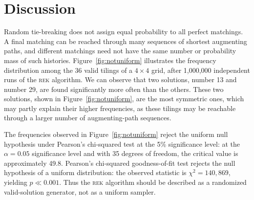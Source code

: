 \documentclass[svgnames,table,runningheads]{llncs}
\newcommand{\rek}{\textsc{rek}\xspace}
\begin{document}
\section{Discussion}
\label{sec:discussion}
Random tie-breaking does not assign equal probability to all perfect matchings. A final matching can be reached through many sequences of shortest augmenting paths, and different matchings need not have the same number or probability mass of such histories. Figure~\ref{fig:notuniform} illustrates the frequency distribution among the 36 valid tilings of a $4\times4$ grid, after 1,000,000 independent runs of the \rek algorithm. We can observe that two solutions, number 13 and number 29, are found significantly more often than the others. These two solutions, shown in Figure~\ref{fig:notuniform}, are the most symmetric ones, which may partly explain their higher frequencies, as these tilings may be reachable through a larger number of augmenting-path sequences.

The frequencies observed in Figure~\ref{fig:notuniform} reject the uniform null hypothesis under Pearson's chi-squared test at the 5\% significance level: at the \(\alpha = 0.05\) significance level and with 35 degrees of freedom, the critical value is approximately 49.8. Pearson’s chi-squared goodness-of-fit test rejects the null hypothesis of a uniform distribution: the observed statistic is \(\chi^2 = 140,869\), yielding \(p \ll 0.001\). Thus the \rek algorithm should be described as a randomized valid-solution generator, not as a uniform sampler.
\end{document}
